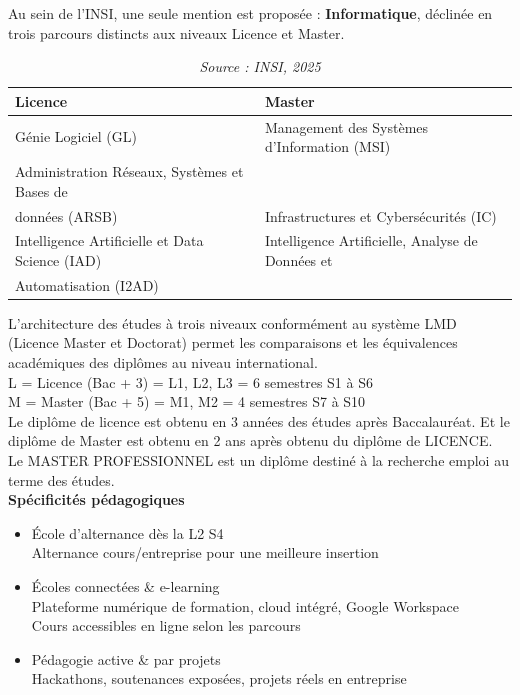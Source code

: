 \documentclass[a4paper,12pt]{book}
\begin{document}
Au sein de l’INSI, une seule mention est proposée : \textbf{Informatique}, déclinée en trois parcours distincts aux niveaux Licence et Master.


\begin{table}[H]
\centering
\begin{tabular}{|l|l|}
\hline
\textbf{Licence} & \textbf{Master} \\
\hline
Génie Logiciel (GL) & Management des Systèmes d’Information (MSI) \\
\hline
Administration Réseaux, Systèmes et Bases de \\données (ARSB) & Infrastructures et Cybersécurités (IC) \\
\hline
Intelligence Artificielle et Data Science (IAD) & Intelligence Artificielle, Analyse de Données et \\Automatisation (I2AD) \\
\hline
\end{tabular}
\caption{Parcours Licence et Master proposés à l’INSI}
\caption*{\textit{Source : INSI, 2025}}
\label{tab:parcours}
\end{table} 

L’architecture des études à trois niveaux conformément au système LMD (Licence Master et Doctorat) permet les comparaisons et les équivalences académiques des diplômes au niveau international.\\
L = Licence (Bac + 3) = L1, L2, L3 = 6 semestres S1 à S6\\
M = Master (Bac + 5) = M1, M2 = 4 semestres S7 à S10\\
Le diplôme de licence est obtenu en 3 années des études après Baccalauréat. Et le diplôme de Master est obtenu en 2 ans après obtenu du diplôme de LICENCE.\\
Le MASTER PROFESSIONNEL est un diplôme destiné à la recherche emploi au terme des études.\\

\textbf{Spécificités pédagogiques} 
\begin{itemize}
    \item École d'alternance dès la L2 S4\\
    Alternance cours/entreprise pour une meilleure insertion
    \item Écoles connectées \& e-learning\\
    Plateforme numérique de formation, cloud intégré, Google Workspace\\
    Cours accessibles en ligne selon les parcours
    \item Pédagogie active \& par projets\\
    Hackathons, soutenances exposées, projets réels en entreprise
\end{itemize}
\end{document}
